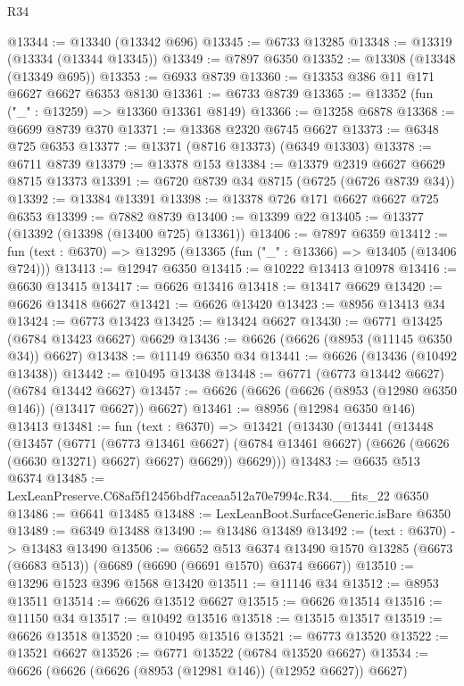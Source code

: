 \begin{lexlean}{R34}
\begin{coremodule}
@13344 := @13340 (@13342 @696)
@13345 := @6733 @13285
@13348 := @13319 (@13334 (@13344 @13345))
@13349 := @7897 @6350
@13352 := @13308 (@13348 (@13349 @695))
@13353 := @6933 @8739
@13360 := @13353 @386 @11 @171 @6627 @6627 @6353 @8130
@13361 := @6733 @8739
@13365 := @13352 (fun ("_" : @13259) => @13360 @13361 @8149)
@13366 := @13258 @6878
@13368 := @6699 @8739 @370
@13371 := @13368 @2320 @6745 @6627
@13373 := @6348 @725 @6353
@13377 := @13371 (@8716 @13373) (@6349 @13303)
@13378 := @6711 @8739
@13379 := @13378 @153
@13384 := @13379 @2319 @6627 @6629 @8715 @13373
@13391 := @6720 @8739 @34 @8715 (@6725 (@6726 @8739 @34))
@13392 := @13384 @13391
@13398 := @13378 @726 @171 @6627 @6627 @725 @6353
@13399 := @7882 @8739
@13400 := @13399 @22
@13405 := @13377 (@13392 (@13398 (@13400 @725) @13361))
@13406 := @7897 @6359
@13412 := fun (text : @6370) => @13295 (@13365 (fun ("_" : @13366) => @13405 (@13406 @724)))
@13413 := @12947 @6350
@13415 := @10222 @13413 @10978
@13416 := @6630 @13415
@13417 := @6626 @13416
@13418 := @13417 @6629
@13420 := @6626 @13418 @6627
@13421 := @6626 @13420
@13423 := @8956 @13413 @34
@13424 := @6773 @13423
@13425 := @13424 @6627
@13430 := @6771 @13425 (@6784 @13423 @6627) @6629
@13436 := @6626 (@6626 (@8953 (@11145 @6350 @34)) @6627)
@13438 := @11149 @6350 @34
@13441 := @6626 (@13436 (@10492 @13438))
@13442 := @10495 @13438
@13448 := @6771 (@6773 @13442 @6627) (@6784 @13442 @6627)
@13457 := @6626 (@6626 (@6626 (@8953 (@12980 @6350 @146)) (@13417 @6627)) @6627)
@13461 := @8956 (@12984 @6350 @146) @13413
@13481 := fun (text : @6370) =>
  @13421
    (@13430
      (@13441
        (@13448
          (@13457
            (@6771
              (@6773 @13461 @6627)
              (@6784 @13461 @6627)
              (@6626 (@6626 (@6630 @13271) @6627) @6627)
              @6629))
          @6629)))
@13483 := @6635 @513 @6374
@13485 := LexLeanPreserve.C68af5f12456bdf7aceaa512a70e7994c.R34.__fits_22 @6350
@13486 := @6641 @13485
@13488 := LexLeanBoot.SurfaceGeneric.isBare @6350
@13489 := @6349 @13488
@13490 := @13486 @13489
@13492 := (text : @6370) -> @13483 @13490
@13506 := @6652
    @513
    @6374
    @13490
    @1570
    @13285
    (@6673 (@6683 @513))
    (@6689 (@6690 (@6691 @1570) @6374 @6667))
@13510 := @13296 @1523 @396 @1568 @13420
@13511 := @11146 @34
@13512 := @8953 @13511
@13514 := @6626 @13512 @6627
@13515 := @6626 @13514
@13516 := @11150 @34
@13517 := @10492 @13516
@13518 := @13515 @13517
@13519 := @6626 @13518
@13520 := @10495 @13516
@13521 := @6773 @13520
@13522 := @13521 @6627
@13526 := @6771 @13522 (@6784 @13520 @6627)
@13534 := @6626 (@6626 (@6626 (@8953 (@12981 @146)) (@12952 @6627)) @6627)

\end{coremodule}
\end{lexlean}
